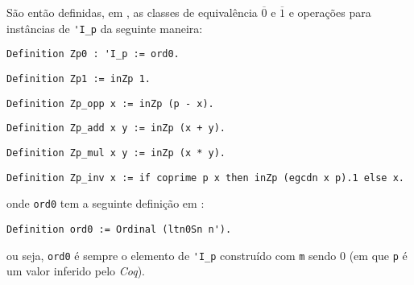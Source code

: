 São então definidas, em \cite{mathcomp-zmodp}, as classes de equivalência $\overline{0}$ e $\overline{1}$ e operações para instâncias de \lstinline[language = coq]{'I_p} da seguinte maneira:
    \begin{lstlisting}[language=coq,frame=single,tabsize=1]
Definition Zp0 : 'I_p := ord0.
    \end{lstlisting}
    \begin{lstlisting}[language=coq,frame=single,tabsize=1]
Definition Zp1 := inZp 1.
    \end{lstlisting}
    \begin{lstlisting}[language=coq,frame=single,tabsize=1]
Definition Zp_opp x := inZp (p - x).
    \end{lstlisting}
    \begin{lstlisting}[language=coq,frame=single,tabsize=1]
Definition Zp_add x y := inZp (x + y).
    \end{lstlisting}
    \begin{lstlisting}[language=coq,frame=single,tabsize=1]
Definition Zp_mul x y := inZp (x * y).
    \end{lstlisting}
    \begin{lstlisting}[language=coq,frame=single,tabsize=1]
Definition Zp_inv x := if coprime p x then inZp (egcdn x p).1 else x.
    \end{lstlisting}
onde \lstinline[language = coq]{ord0} tem a seguinte definição em \cite{mathcomp-zmodp}:
    \begin{lstlisting}[language=coq,frame=single,tabsize=1]
Definition ord0 := Ordinal (ltn0Sn n').
    \end{lstlisting}
ou seja, \lstinline[language = coq]{ord0} é sempre o elemento de \lstinline[language = coq]{'I_p} construído com \lstinline[language = coq]{m} sendo 0 (em que \lstinline[language = coq]{p} é um valor inferido pelo \textit{Coq}).


